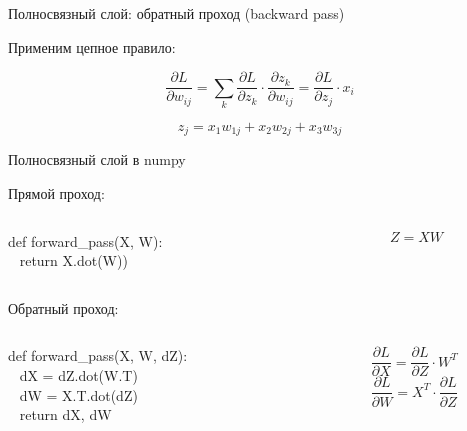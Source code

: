 \documentclass[notes,12pt, aspectratio=169]{beamer}
\newenvironment{wideitemize}{\itemize\addtolength{\itemsep}{10pt}}{\enditemize}
\begin{document}
\begin{frame}{Полносвязный слой: обратный проход (backward pass)}
\begin{wideitemize}
	\item Применим цепное правило: 
	
	\[
	\frac{\partial L}{\partial w_{ij}} =  \sum_k \frac{\partial L}{\partial z_k} \cdot \frac{\partial z_k}{\partial w_{ij}} =   \frac{\partial L}{\partial z_j} \cdot x_i
	\]
	
	\[
	z_j = x_1 w_{1j} + x_2 w_{2j} + x_3 w_{3j} 
	\]
	
\end{wideitemize}
\end{frame}


\begin{frame}[fragile]{Полносвязный слой в numpy}

\alert{Прямой проход:} 
	
\begin{columns}
\begin{column}{.49\textwidth}
{\color{green} def}  {\color{blue} forward\_pass}(X, W):  \\
\mbox{ } \hspace{5mm} {\color{green} return } X.dot(W))
\end{column}
\begin{column}{.49\textwidth}
\[ Z = XW \]
\end{column}
\end{columns}

\vfill 

\alert{Обратный проход:}

\begin{columns}
\begin{column}{.49\textwidth}
{\color{green} def}  {\color{blue} forward\_pass}(X, W, dZ):  \\
\mbox{ } \hspace{5mm} dX = dZ.dot(W.T) \\
\mbox{ } \hspace{5mm} dW = X.T.dot(dZ) \\
\mbox{ } \hspace{5mm} {\color{green} return } dX, dW
\end{column}
\begin{column}{.49\textwidth}

\[  \frac{\partial L}{\partial X}  =   \frac{\partial L}{\partial Z} \cdot W^T \]
\[ \frac{\partial L}{\partial W}  =  X^T \cdot \frac{\partial L}{\partial Z} \]
\end{column}
\end{columns}
\end{frame}
\end{document}

